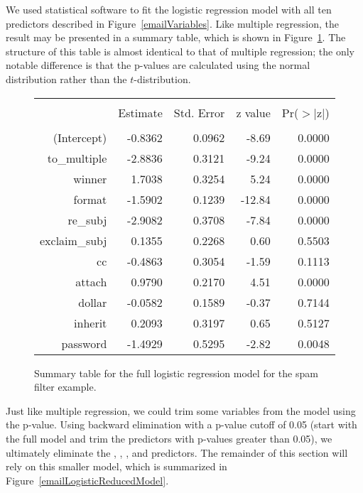 We used statistical software to fit the logistic regression model with all ten predictors described in Figure~\ref{emailVariables}. Like multiple regression, the result may be presented in a summary table, which is shown in Figure~\ref{emailLogisticModelResults}. The structure of this table is almost identical to that of multiple regression; the only notable difference is that the p-values are calculated using the normal distribution rather than the $t$-distribution.

\begin{figure}[ht]
\centering
\begin{tabular}{rrrrr}
  \hline
  \vspace{-3.7mm} & & & & \\
 & Estimate & Std. Error & z value & Pr($>$$|$z$|$) \\ 
  \hline
  \vspace{-3.8mm} & & & & \\
(Intercept) & -0.8362 & 0.0962 & -8.69 & 0.0000 \\ 
  to\_\hspace{0.3mm}multiple & -2.8836 & 0.3121 & -9.24 & 0.0000 \\ 
  winner & 1.7038 & 0.3254 & 5.24 & 0.0000 \\ 
  format & -1.5902 & 0.1239 & -12.84 & 0.0000 \\ 
  re\_\hspace{0.3mm}subj & -2.9082 & 0.3708 & -7.84 & 0.0000 \\ 
  exclaim\_\hspace{0.3mm}subj & 0.1355 & 0.2268 & 0.60 & 0.5503 \\ 
  cc & -0.4863 & 0.3054 & -1.59 & 0.1113 \\ 
  attach & 0.9790 & 0.2170 & 4.51 & 0.0000 \\ 
  dollar & -0.0582 & 0.1589 & -0.37 & 0.7144 \\ 
  inherit & 0.2093 & 0.3197 & 0.65 & 0.5127 \\ 
  password & -1.4929 & 0.5295 & -2.82 & 0.0048 \\ 
\hline
\end{tabular}
\caption{Summary table for the full logistic regression model for the spam filter example.}
\label{emailLogisticModelResults}
\end{figure}

Just like multiple regression, we could trim some variables from the model using the p-value. Using backward elimination with a p-value cutoff of 0.05 (start with the full model and trim the predictors with p-values greater than 0.05), we ultimately eliminate the , , , and  predictors. The remainder of this section will rely on this smaller model, which is summarized in Figure~\ref{emailLogisticReducedModel}.


